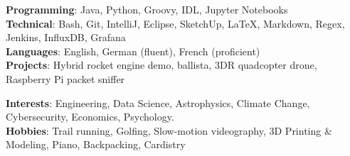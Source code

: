 \documentclass[11pt,a4paper]{article}
\begin{document}
\spacedhrule{-.6em}{-0.6em}


\vspace{-1em}
\begin{multicols*}{2}
\hspace{-2.3em} 
\textbf{Programming}: Java, Python, Groovy, IDL, Jupyter Notebooks \\
\textbf{Technical}: Bash, Git, IntelliJ, Eclipse, SketchUp, \LaTeX, Markdown, Regex, Jenkins, InfluxDB, Grafana \\
\textbf{Languages}:
English, German (fluent), French (proficient)\\
\textbf{Projects}:
Hybrid rocket engine demo, ballista, 3DR quadcopter drone, Raspberry Pi packet sniffer

\hspace{-2.3em} \textbf{Interests}: Engineering, Data Science, Astrophysics, Climate Change, Cybersecurity, Economics, Psychology. \\
\textbf{Hobbies}: Trail running, Golfing, Slow-motion videography, 3D Printing \& Modeling, Piano, Backpacking, Cardistry
	
\end{multicols*}
\end{document}

